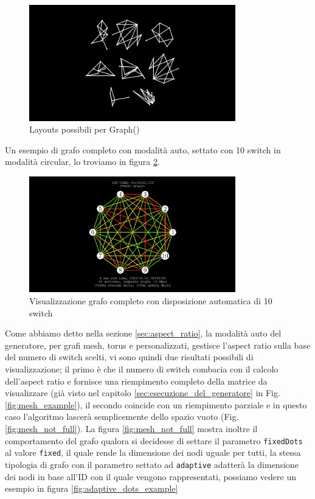 \documentclass[binding=0.6cm]{sapthesis}
\begin{document}
\begin{figure}[h]
    \centering
    \includegraphics[width=0.8\textwidth]{immagini/graph_layouts_types.png}
    \caption{Layouts possibili per Graph()}
    \label{fig:graph_layouts_types}
\end{figure}


Un esempio di grafo completo con modalità auto, settato con 10 switch in modalità circular, lo troviamo in figura \ref{fig:custom_complete_autopositioning10}.

\begin{figure}[h]
    \centering
    \includegraphics[width=0.8\textwidth]{immagini/auto_complete_10.JPG}
    \caption{Visualizzazione grafo completo con disposizione automatica di 10 switch}
    \label{fig:custom_complete_autopositioning10}
\end{figure}

Come abbiamo detto nella sezione \ref{sec:aspect_ratio}, la modalità auto del generatore, per grafi mesh, torus e personalizzati, gestisce l'aspect ratio sulla base del numero di switch scelti, vi sono quindi
due risultati possibili di visualizzazione; il primo è che il numero di switch combacia con il calcolo dell'aspect ratio e fornisce una riempimento
completo della matrice da visualizzare (già visto nel capitolo \ref{sec:esecuzione_del_generatore} in Fig. \ref{fig:mesh_example}), 
il secondo coincide con un riempimento parziale e in questo caso l'algoritmo lascerà semplicemente dello spazio vuoto (Fig. \ref{fig:mesh_not_full}).
La figura \ref{fig:mesh_not_full} mostra inoltre il comportamento del grafo qualora si decidesse di settare il parametro \lstinline|fixedDots| al valore \lstinline|fixed|, 
il quale rende la dimensione dei nodi uguale per tutti, la stessa tipologia di grafo con il parametro settato ad \lstinline|adaptive| adatterà la dimensione dei nodi
in base all'ID con il quale vengono rappresentati, possiamo vedere un esempio in figura \ref{fig:adaptive_dots_example}
\end{document}
